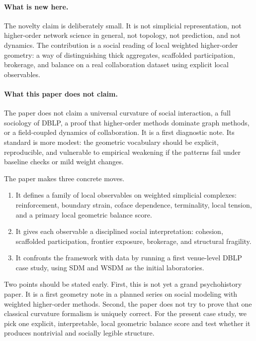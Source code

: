 \documentclass[11pt]{article}
\begin{document}
\paragraph{What is new here.}
The novelty claim is deliberately small. It is not simplicial representation, not higher-order network science in general, not topology, not prediction, and not dynamics. The contribution is a social reading of local weighted higher-order geometry: a way of distinguishing thick aggregates, scaffolded participation, brokerage, and balance on a real collaboration dataset using explicit local observables.

\paragraph{What this paper does not claim.}
The paper does not claim a universal curvature of social interaction, a full sociology of DBLP, a proof that higher-order methods dominate graph methods, or a field-coupled dynamics of collaboration. It is a first diagnostic note. Its standard is more modest: the geometric vocabulary should be explicit, reproducible, and vulnerable to empirical weakening if the patterns fail under baseline checks or mild weight changes.

The paper makes three concrete moves.
\begin{enumerate}[label=(\roman*)]
    \item It defines a family of local observables on weighted simplicial complexes: reinforcement, boundary strain, coface dependence, terminality, local tension, and a primary local geometric balance score.
    \item It gives each observable a disciplined social interpretation: cohesion, scaffolded participation, frontier exposure, brokerage, and structural fragility.
    \item It confronts the framework with data by running a first venue-level DBLP case study, using SDM and WSDM as the initial laboratories.
\end{enumerate}

Two points should be stated early. First, this is not yet a grand psychohistory paper. It is a first geometry note in a planned series on social modeling with weighted higher-order methods. Second, the paper does not try to prove that one classical curvature formalism is uniquely correct. For the present case study, we pick one explicit, interpretable, local geometric balance score and test whether it produces nontrivial and socially legible structure.
\end{document}
